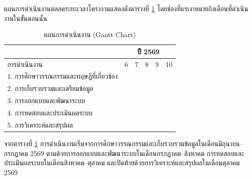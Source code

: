 แผนการดำเนินงานตลอดระยะเวลาโครงงานแสดงดังตารางที่ \ref{tab:gantt} โดยช่องที่แรเงาหมายถึงเดือนที่ดำเนินงานในขั้นตอนนั้น

\begin{table}[H]
\centering
\caption{แผนการดำเนินงาน (Gantt Chart)}
\label{tab:gantt}
\begin{tabular}{|p{5.5cm}|c|c|c|c|c|}
\hline
 & \multicolumn{5}{c|}{ปี 2569} \\
\hline
การดำเนินงาน & 6 & 7 & 8 & 9 & 10 \\
\hline
1. การศึกษาวรรณกรรมและทฤษฎีที่เกี่ยวข้อง
 & \cellcolor{gray!60} & & & & \\
\hline
2. การเก็บรวบรวมและเตรียมข้อมูล
 & \cellcolor{gray!60} & \cellcolor{gray!60} & & & \\
\hline
3. การออกแบบและพัฒนาระบบ
 & & \cellcolor{gray!60} & \cellcolor{gray!60} & & \\
\hline
4. การทดสอบและประเมินผลระบบ
 & & & \cellcolor{gray!60} & \cellcolor{gray!60} & \cellcolor{gray!60} \\
\hline
5. การวิเคราะห์และสรุปผล
 & & & & & \cellcolor{gray!60} \\
\hline
\end{tabular}
\end{table}

จากตารางที่ \ref{tab:gantt} การดำเนินงานเริ่มจากการศึกษาวรรณกรรมและเก็บรวบรวมข้อมูลในเดือนมิถุนายน--กรกฎาคม 2569 ตามด้วยการออกแบบและพัฒนาระบบในเดือนกรกฎาคม--สิงหาคม การทดสอบและประเมินผลระบบในเดือนสิงหาคม--ตุลาคม และปิดท้ายด้วยการวิเคราะห์และสรุปผลในเดือนตุลาคม 2569